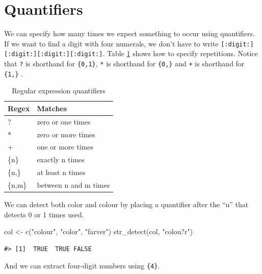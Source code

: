 \documentclass[
]{krantz}
\makeatletter
\newenvironment{Shaded}{\begin{snugshade}}{\end{snugshade}}
\newcommand{\FunctionTok}[1]{\textcolor[rgb]{0.00,0.00,0.00}{#1}}
\newcommand{\NormalTok}[1]{#1}
\newcommand{\OtherTok}[1]{\textcolor[rgb]{0.56,0.35,0.01}{#1}}
\newcommand{\StringTok}[1]{\textcolor[rgb]{0.31,0.60,0.02}{#1}}
\newenvironment{kframe}{%
\medskip{}
\setlength{\fboxsep}{.8em}
 \def\at@end@of@kframe{}%
 \ifinner\ifhmode%
  \def\at@end@of@kframe{\end{minipage}}%
  \begin{minipage}{\columnwidth}%
 \fi\fi%
 \def\FrameCommand##1{\hskip\@totalleftmargin \hskip-\fboxsep
 \colorbox{shadecolor}{##1}\hskip-\fboxsep
     \hskip-\linewidth \hskip-\@totalleftmargin \hskip\columnwidth}%
 \MakeFramed {\advance\hsize-\width
   \@totalleftmargin\z@ \linewidth\hsize
   \@setminipage}}%
 {\par\unskip\endMakeFramed%
 \at@end@of@kframe}
\renewenvironment{Shaded}{\begin{kframe}}{\end{kframe}}
\makeatother
\begin{document}
\hypertarget{quantifiers}{%
\section{Quantifiers}\label{quantifiers}}

We can specify how many times we expect something to occur using quantifiers. If we want to find a digit with four numerals, we don't have to write \texttt{{[}:digit:{]}{[}:digit:{]}{[}:digit:{]}{[}:digit:{]}}. Table \ref{tab:greedyquantifiers} shows how to specify repetitions. Notice that \texttt{?} is shorthand for \texttt{\{0,1\}}, \texttt{*} is shorthand for \texttt{\{0,\}} and \texttt{+} is shorthand for \texttt{\{1,\}} \citep{levithan2012regular}.

\begin{table}

\caption{\label{tab:greedyquantifiers}Regular expression quantifiers}
\centering
\begin{tabular}[t]{ll}
\toprule
Regex & Matches\\
\midrule
? & zero or one times\\
* & zero or more times\\
+ & one or more times\\
\{n\} & exactly n times\\
\{n,\} & at least n times\\
\addlinespace
\{n,m\} & between n and m times\\
\bottomrule
\end{tabular}
\end{table}

We can detect both color and colour by placing a quantifier after the ``u'' that detects 0 or 1 times used.

\begin{Shaded}
\begin{Highlighting}[]
\NormalTok{col }\OtherTok{\textless{}{-}} \FunctionTok{c}\NormalTok{(}\StringTok{"colour"}\NormalTok{, }\StringTok{"color"}\NormalTok{, }\StringTok{"farver"}\NormalTok{)}
\FunctionTok{str\_detect}\NormalTok{(col, }\StringTok{"colou?r"}\NormalTok{)}
\end{Highlighting}
\end{Shaded}

\begin{verbatim}
#> [1]  TRUE  TRUE FALSE
\end{verbatim}

And we can extract four-digit numbers using \texttt{\{4\}}.
\end{document}
